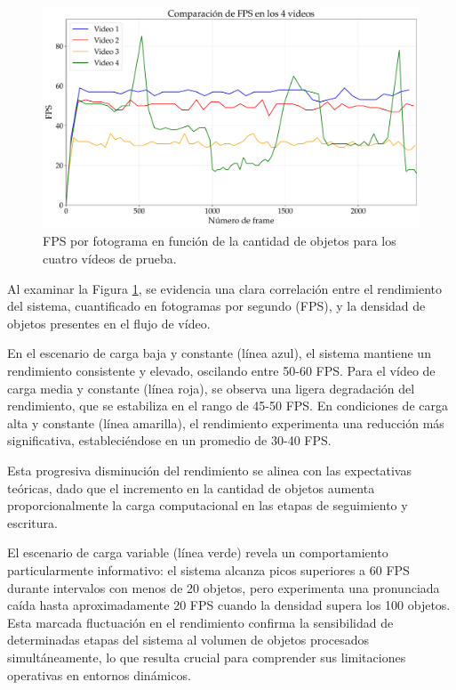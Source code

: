 \documentclass[11pt,spanish,listoffigures,listoftables]{tfgetsinf}
\begin{document}
\begin{figure}[H]
   \centering
   \includegraphics[width=\linewidth]{excels/inferencia/cantidad_objetos/resultados/max_fps_4_videos/fps_comparison.pdf}
   \caption[FPS por fotograma en función de la cantidad de objetos para los cuatro vídeos de prueba]{FPS por fotograma en función de la cantidad de objetos para los cuatro vídeos de prueba.}
   \label{fig:fps_por_frame}
\end{figure}

Al examinar la Figura \ref{fig:fps_por_frame}, se evidencia una clara correlación entre el rendimiento del sistema, cuantificado en fotogramas por segundo (FPS), y la densidad de objetos presentes en el flujo de vídeo. 

En el escenario de carga baja y constante (línea azul), el sistema mantiene un rendimiento consistente y elevado, oscilando entre 50-60 FPS. Para el vídeo de carga media y constante (línea roja), se observa una ligera degradación del rendimiento, que se estabiliza en el rango de 45-50 FPS. En condiciones de carga alta y constante (línea amarilla), el rendimiento experimenta una reducción más significativa, estableciéndose en un promedio de 30-40 FPS. 

Esta progresiva disminución del rendimiento se alinea con las expectativas teóricas, dado que el incremento en la cantidad de objetos aumenta proporcionalmente la carga computacional en las etapas de seguimiento y escritura.

El escenario de carga variable (línea verde) revela un comportamiento particularmente informativo: el sistema alcanza picos superiores a 60 FPS durante intervalos con menos de 20 objetos, pero experimenta una pronunciada caída hasta aproximadamente 20 FPS cuando la densidad supera los 100 objetos. Esta marcada fluctuación en el rendimiento confirma la sensibilidad de determinadas etapas del sistema al volumen de objetos procesados simultáneamente, lo que resulta crucial para comprender sus limitaciones operativas en entornos dinámicos.
\end{document}
